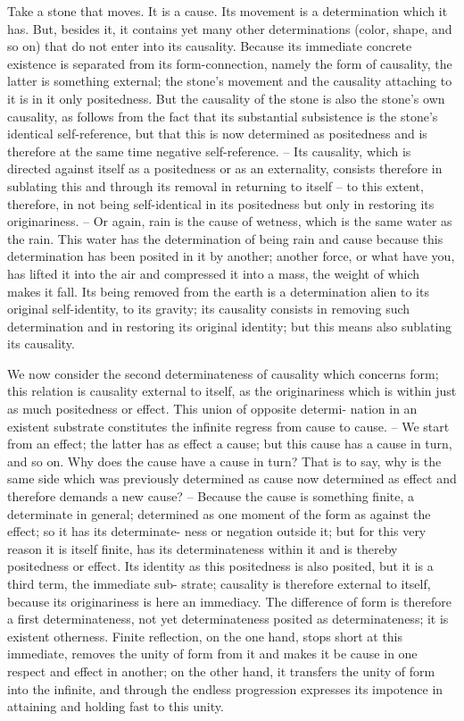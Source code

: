Take a stone that moves. It is a cause.
Its movement is a determination which it has.
But, besides it, it contains yet many other determinations
(color, shape, and so on) that do not enter into its causality.
Because its immediate concrete existence is separated from its form-connection,
namely the form of causality, the latter is something external;
the stone’s movement and the causality attaching to it is in it only positedness.
But the causality of the stone is also the stone’s own causality,
as follows from the fact that its substantial subsistence is the stone’s identical self-reference,
but that this is now determined as positedness and is therefore at the same
time negative self-reference. – Its causality, which is directed against itself as
a positedness or as an externality, consists therefore in sublating this and
through its removal in returning to itself – to this extent, therefore, in not
being self-identical in its positedness but only in restoring its originariness. –
Or again, rain is the cause of wetness, which is the same water as the rain.
This water has the determination of being rain and cause because this
determination has been posited in it by another; another force, or what
have you, has lifted it into the air and compressed it into a mass, the weight
of which makes it fall. Its being removed from the earth is a determination
alien to its original self-identity, to its gravity; its causality consists in
removing such determination and in restoring its original identity; but this
means also sublating its causality.

We now consider the second determinateness of causality which concerns
form; this relation is causality external to itself, as the originariness which is
within just as much positedness or effect. This union of opposite determi-
nation in an existent substrate constitutes the infinite regress from cause to
cause. – We start from an effect; the latter has as effect a cause; but this
cause has a cause in turn, and so on. Why does the cause have a cause in
turn? That is to say, why is the same side which was previously determined
as cause now determined as effect and therefore demands a new cause? –
Because the cause is something finite, a determinate in general; determined
as one moment of the form as against the effect; so it has its determinate-
ness or negation outside it; but for this very reason it is itself finite, has its
determinateness within it and is thereby positedness or effect. Its identity as
this positedness is also posited, but it is a third term, the immediate sub-
strate; causality is therefore external to itself, because its originariness is here
an immediacy. The difference of form is therefore a first determinateness,
not yet determinateness posited as determinateness; it is existent otherness.
Finite reflection, on the one hand, stops short at this immediate, removes
the unity of form from it and makes it be cause in one respect and effect in
another; on the other hand, it transfers the unity of form into the infinite,
and through the endless progression expresses its impotence in attaining
and holding fast to this unity.

